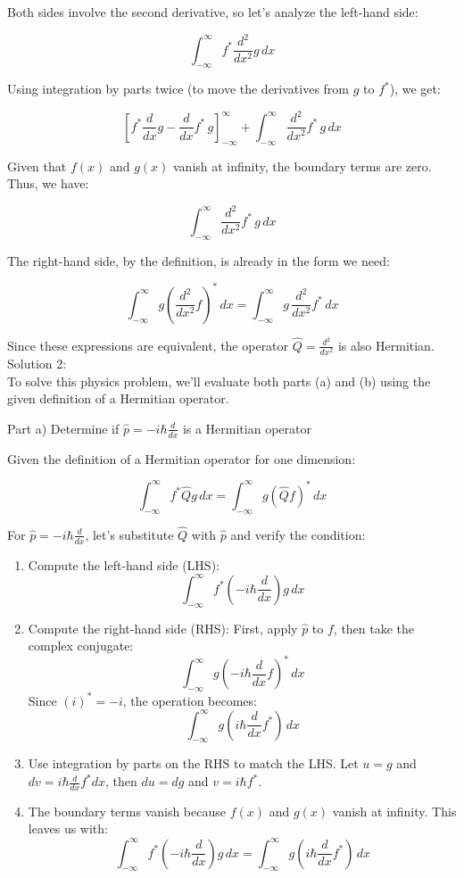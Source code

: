 \documentclass[a4paper,11pt]{article}
\begin{document}
Both sides involve the second derivative, so let's analyze the left-hand side:

\[ \int_{-\infty}^{\infty} f^{*}\frac{d^{2}}{dx^{2}}g \, dx \]

Using integration by parts twice (to move the derivatives from \(g\) to \(f^{*}\)), we get:

\[ \left[ f^{*}\frac{d}{dx}g - \frac{d}{dx}f^{*} \, g \right]_{-\infty}^{\infty} + \int_{-\infty}^{\infty} \frac{d^{2}}{dx^{2}}f^{*} \, g \, dx \]

Given that \(f(x)\) and \(g(x)\) vanish at infinity, the boundary terms are zero. Thus, we have:

\[ \int_{-\infty}^{\infty} \frac{d^{2}}{dx^{2}}f^{*} \, g \, dx \]

The right-hand side, by the definition, is already in the form we need:

\[ \int_{-\infty}^{\infty} g\left(\frac{d^{2}}{dx^{2}}f\right)^{*} \, dx = \int_{-\infty}^{\infty} g \, \frac{d^{2}}{dx^{2}}f^{*} \, dx \]

Since these expressions are equivalent, the operator \( \hat{Q} = \frac{d^{2}}{dx^{2}} \) is also Hermitian. \\ 

\noindent Solution 2: \\

To solve this physics problem, we'll evaluate both parts (a) and (b) using the given definition of a Hermitian operator.

Part a) Determine if \( \hat{p} = -i\hbar\frac{d}{dx} \) is a Hermitian operator

Given the definition of a Hermitian operator for one dimension:

\[ \int_{-\infty}^{\infty} f^{*}\hat{Q}g \, dx = \int_{-\infty}^{\infty} g(\hat{Q}f)^{*} \, dx \]

For \( \hat{p} = -i\hbar\frac{d}{dx} \), let's substitute \( \hat{Q} \) with \( \hat{p} \) and verify the condition:

\begin{enumerate}
    \item Compute the left-hand side (LHS):
    \[ \int_{-\infty}^{\infty} f^{*}(-i\hbar\frac{d}{dx})g \, dx \]
    
    \item Compute the right-hand side (RHS):
    First, apply \( \hat{p} \) to \( f \), then take the complex conjugate:
    \[ \int_{-\infty}^{\infty} g(-i\hbar\frac{d}{dx}f)^{*} \, dx \]
    Since \( (i)^{*} = -i \), the operation becomes:
    \[ \int_{-\infty}^{\infty} g(i\hbar\frac{d}{dx}f^{*}) \, dx \]
    
    \item Use integration by parts on the RHS to match the LHS. Let \( u = g \) and \( dv = i\hbar\frac{d}{dx}f^{*}dx \), then \( du = dg \) and \( v = i\hbar f^{*} \).
    
    \item The boundary terms vanish because \( f(x) \) and \( g(x) \) vanish at infinity. This leaves us with:
    \[ \int_{-\infty}^{\infty} f^{*}(-i\hbar\frac{d}{dx})g \, dx = \int_{-\infty}^{\infty} g(i\hbar\frac{d}{dx}f^{*}) \, dx \]
\end{enumerate}
\end{document}
